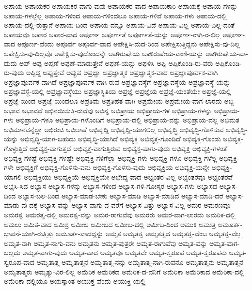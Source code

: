{ಅಪಾಯ
ಅಪಾಯಕರ
ಅಪಾಯಕರ-ವಾಗು-ವುವು
ಅಪಾಯಕರ-ವಾದ
ಅಪಾಯಕಾರಿ
ಅಪಾಯಕ್ಕೆ
ಅಪಾಯ-ಗಳನ್ನು
ಅಪಾಯ-ಗಳಲ್ಲೆಲ್ಲ
ಅಪಾಯ-ಗಳಿಂದ
ಅಪಾಯ-ಗಳಿಂದಲೂ
ಅಪಾಯ-ಗಳಿವೆ
ಅಪಾಯ-ಗಳು
ಅಪಾಯ-ದಲ್ಲಿ
ಅಪಾಯ-ದಲ್ಲಿ-ರುತ್ತಾನೆ
ಅಪಾಯ-ದಿಂದ
ಅಪಾಯ-ವನ್ನೂ
ಅಪಾಯ-ವಿದೆ
ಅಪಾಯ-ವಿಲ್ಲ
ಅಪಾಯ-ವಿಲ್ಲ-ದಂತೆ
ಅಪಾಯವೂ
ಅಪಾರ
ಅಪಾರ-ವಾದ
ಅಪೂರ್ಣ
ಅಪೂರ್ಣತೆ
ಅಪೂರ್ಣತೆ-ಯನ್ನು
ಅಪೂರ್ಣ-ರಾಗಿ-ರ-ಲಿಲ್ಲ
ಅಪೂರ್ಣ-ವಾದ
ಅಪೂರ್ಣ-ವೆಂದು
ಅಪೂರ್ವ
ಅಪೂರ್ವ-ವಾದ
ಅಪೇಕ್ಷಿಸಿ-ದುದ-ರಿಂದ
ಅಪೇಕ್ಷಿಸುತ್ತಿದ್ದನು
ಅಪೇಕ್ಷಿಸು-ವು-ದಿಲ್ಲ
ಅಪೇಕ್ಷಿಸು-ವು-ದಿಲ್ಲವೊ
ಅಪೇಕ್ಷಿಸು-ವುದೊಂದನ್ನೇ
ಅಪೌರುಷೇಯ
ಅಪೌರುಷೇಯ-ವಾಣಿ-ಯನ್ನು
ಅಪೌರುಷೇಯ-ವಾ-ದುದು
ಅಪ್
ಅಪ್ಪ
ಅಪ್ಪಣೆ
ಅಪ್ಪಣೆ-ಮಾಡುತ್ತೇನೆ
ಅಪ್ಪಣೆ-ಯನ್ನು
ಅಪ್ಪಳಿಸಿ
ಅಪ್ಪಿ
ಅಪ್ಪಿಕೊಂಡಿ-ರು-ವರು
ಅಪ್ಪಿಕೊಂಡಿ-ರು-ವುದು
ಅಪ್ಪಿದ್ದ
ಅಪ್ಪುತ್ತೇವೆ
ಅಪ್ಪುವ
ಅಪ್ರಜ್ಞಾ
ಅಪ್ರಜ್ಞಾತ್ಮಕ
ಅಪ್ರಜ್ಞಾತ್ಮಕ-ವಾದ
ಅಪ್ರಜ್ಞಾಪೂರ್ವಕ-ವಾಗಿ
ಅಪ್ರಜ್ಞಾಪೂರ್ವಕ-ವಾಗಿದೆ
ಅಪ್ರಜ್ಞಾಪೂರ್ವಕ-ವಾಗಿ-ರುವ
ಅಪ್ರಜ್ಞಾವಸ್ಥೆಗೆ
ಅಪ್ರಜ್ಞಾವಸ್ಥೆಯ
ಅಪ್ರಜ್ಞಾವಸ್ಥೆ-ಯನ್ನು
ಅಪ್ರಜ್ಞಾವಸ್ಥೆ-ಯಲ್ಲಿ
ಅಪ್ರಜ್ಞಾವಸ್ಥೆಯು
ಅಪ್ರಜ್ಞಾಸ್ಥಿತಿಯ
ಅಪ್ರಜ್ಞೆ
ಅಪ್ರಜ್ಞೆಯ
ಅಪ್ರಜ್ಞೆ-ಯಂತೆಯೇ
ಅಪ್ರಜ್ಞೆ-ಯಲ್ಲಿ
ಅಪ್ರಜ್ಞೆ-ಯಿಂದ
ಅಪ್ರಜ್ಞೆ-ಯಿಂದಲೂ
ಅಪ್ರತಿಮ
ಅಪ್ರತಿಹತ-ವಾಗಿ
ಅಪ್ರಮೇಯ
ಅಪ್ರಮೇಯ-ವಾಗ-ಲಾರದು
ಅಬ್ಬ
ಅಭಾವ
ಅಭಾವವೆ
ಅಭಿನಯಿಸುತ್ತಿ-ರುವೆವು
ಅಭಿನ್ನ
ಅಭಿಪ್ರಾಯ
ಅಭಿಪ್ರಾಯ-ಗಳ
ಅಭಿಪ್ರಾಯ-ಗಳನ್ನು
ಅಭಿಪ್ರಾಯ-ಗಳು
ಅಭಿಪ್ರಾಯ-ಗಳೂ
ಅಭಿಪ್ರಾಯ-ಗಳೊಂದಿಗೆ
ಅಭಿಪ್ರಾಯ-ದಲ್ಲಿ
ಅಭಿಪ್ರಾಯ-ವನ್ನು
ಅಭಿಪ್ರಾಯ-ವಲ್ಲ
ಅಭಿಮತ
ಅಭಿಮಾನವನ್ನೆಲ್ಲಾ
ಅಭಿರುಚಿ
ಅಭಿಲಾಷೆ
ಅಭಿವೃದ್ದಿ
ಅಭಿವೃದ್ದಿ-ಯಾಗಲಿಲ್ಲ
ಅಭಿವೃದ್ಧಿ
ಅಭಿವೃದ್ಧಿ-ಗೊಳಿಸುವ
ಅಭಿವೃದ್ಧಿ-ಯನ್ನು
ಅಭಿವೃದ್ಧಿ-ಯಾಗ-ಬಹುದು
ಅಭಿವೃದ್ಧಿ-ಯಾಗಿದೆ
ಅಭಿವ್ಯಕ್ತ
ಅಭಿವ್ಯಕ್ತ-ಗೊಂಡಿದೆ
ಅಭಿವ್ಯಕ್ತ-ಗೊಂಡು
ಅಭಿವ್ಯಕ್ತ-ಗೊಳ್ಳುತ್ತಿದೆ
ಅಭಿವ್ಯಕ್ತ-ವಾಗುತ್ತದೆ
ಅಭಿವ್ಯಕ್ತ-ವಾಗುತ್ತಿರುವ
ಅಭಿವ್ಯಕ್ತ-ವಾಗು-ವುದು
ಅಭಿವ್ಯಕ್ತಿ
ಅಭಿವ್ಯಕ್ತಿ-ಗಳಂತೆ
ಅಭಿವ್ಯಕ್ತಿ-ಗಳಷ್ಟೆ
ಅಭಿವ್ಯಕ್ತಿ-ಗಳಷ್ಟೇ
ಅಭಿವ್ಯಕ್ತಿ-ಗಳಿಗೆಲ್ಲಾ
ಅಭಿವ್ಯಕ್ತಿ-ಗಳು
ಅಭಿವ್ಯಕ್ತಿ-ಗಳೂ
ಅಭಿವ್ಯಕ್ತಿ-ಗಳೆಲ್ಲ
ಅಭಿವ್ಯಕ್ತಿ-ಗಳೇ
ಅಭಿವ್ಯಕ್ತಿಗೆ
ಅಭಿವ್ಯಕ್ತಿ-ಗೊಳಿಸು-ವನು
ಅಭಿವ್ಯಕ್ತಿ-ಗೊಳಿಸು-ವುದು
ಅಭಿವ್ಯಕ್ತಿಯ
ಅಭಿವ್ಯಕ್ತಿ-ಯನ್ನೇ
ಅಭಿವ್ಯಕ್ತಿ-ಯಾಗಲಿ
ಅಭಿವ್ಯಕ್ತಿಯು
ಅಭಿವ್ಯಕ್ತಿಯೆ
ಅಭಿವ್ಯಕ್ತಿಯೇ
ಅಭೇದ್ಯ-ವಾದ
ಅಭ್ಯಂತರ-ವಿಲ್ಲ
ಅಭ್ಯಂತರವೂ
ಅಭ್ಯಂತರವೆ
ಅಭ್ಯಸಿ-ಸಿದ
ಅಭ್ಯಾಸ
ಅಭ್ಯಾಸ-ಗಳನ್ನು
ಅಭ್ಯಾಸ-ಗಳಿಂದ
ಅಭ್ಯಾಸ-ಗಳಿ-ಗೋಸ್ಕರ
ಅಭ್ಯಾಸ-ಗಳು
ಅಭ್ಯಾಸದ
ಅಭ್ಯಾಸ-ದಿಂದ
ಅಭ್ಯಾಸ-ಬಲ-ದಿಂದ
ಅಭ್ಯಾಸ-ಮಾಡ-ಬೇಕು
ಅಭ್ಯಾಸ-ಮಾಡಿ
ಅಭ್ಯಾಸ-ಮಾಡಿದ
ಅಭ್ಯಾಸ-ಮಾಡಿ-ದರೆ
ಅಭ್ಯಾಸ-ಮಾಡು-ವು-ದಕ್ಕೆ
ಅಭ್ಯಾಸ-ವನ್ನು
ಅಭ್ಯಾಸ-ವಾಗು-ವ-ವರೆಗೆ
ಅಭ್ಯಾಸ-ವಿತ್ತು
ಅಭ್ಯಾಸ-ವಿಲ್ಲ
ಅಮರ
ಅಮರಣವೂ
ಅಮರತ್ವ
ಅಮರತ್ವ-ದಲ್ಲಿ
ಅಮರತ್ವ-ವನ್ನು
ಅಮರ-ರಾಗುವೆವು
ಅಮರರು
ಅಮರ-ವಾಗ-ಲಾರದು
ಅಮರಿಕ-ದಲ್ಲಿ
ಅಮಲು
ಅಮಿತ-ವಾದ
ಅಮಿಶ್ರ
ಅಮೀಬ
ಅಮೀಬದ
ಅಮೀಬ-ದಲ್ಲಿ
ಅಮೀಬ-ದಿಂದ
ಅಮುಕಿ
ಅಮುತ್ರ
ಅಮೂರ್ತ-ಭಾವನೆ-ಯಾಗಿ-ರುತ್ತಿತ್ತು
ಅಮೂರ್ತ-ವಾದದ್ದನ್ನು
ಅಮೃತ
ಅಮೃತತ್ವ
ಅಮೃತತ್ವದ
ಅಮೃತತ್ವ-ವೆಂಬ
ಅಮೃತತ್ವ-ವೆಲ್ಲ
ಅಮೃತ-ನಾಗಿ
ಅಮೃತ-ನಾಗು-ವನು
ಅಮೃತನು
ಅಮೃತ-ಪುತ್ರರೇ
ಅಮೃತ-ರಾಗುವೆವು
ಅಮೃತ-ವನ್ನು
ಅಮೃತ-ವಾಗ-ಬಲ್ಲದು
ಅಮೃತ-ವಾಗು-ವುದು
ಅಮೃತ-ವಾದ
ಅಮೃತವೂ
ಅಮೃತವೇ
ಅಮೃತ-ಸ್ವರೂಪ
ಅಮೃತ-ಸ್ವರೂಪನು
ಅಮೃತ-ಸ್ವರೂಪ-ವಾದ
ಅಮೃತಾತ್ಮ
ಅಮೃತಾತ್ಮನ
ಅಮೃತಾತ್ಮ-ನನ್ನು
ಅಮೃತಾತ್ಮ-ನಾಗಿ-ರುವನೊ
ಅಮೃತಾತ್ಮನು
ಅಮೃತಾತ್ಮನೆ
ಅಮೃತಾತ್ಮರು
ಅಮೃತ್ಯು-ವಿರ-ಲಿಲ್ಲ
ಅಮೆರಿಕ
ಅಮೆರಿಕದ
ಅಮೆರಿಕ-ದ-ವನಿಗೆ
ಅಮೆರಿಕಾ
ಅಮೆರಿಕಾದ
ಅಮೆರಿಕಾ-ದಲ್ಲಿ
ಅಮೆರಿಕಾ-ದಲ್ಲಿಯೂ
ಅಯಸ್ಕಾಂತ
ಅಯುಕ್ತ-ವೆಂದು
ಅಯುಕ್ತಿ-ಯಲ್ಲಿ
}
